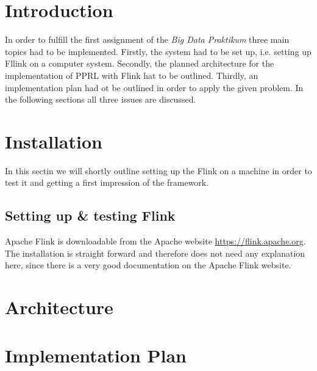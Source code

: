 \documentclass[10pt]{article}
\begin{document}
    

    \section{Introduction}

        In order to fulfill the first assignment of the \textit{Big Data Praktikum} three main topics had to be
        implemented. Firstly, the system had to be set up, i.e. setting up Fllink on a computer system. Secondly,
        the planned architecture for the implementation of PPRL with Flink hat to be outlined. Thirdly, an
        implementation plan had ot be outlined in order to apply the given problem.
        In the following sections all three issues are discussed.

    \section{Installation}

        In this sectin we will shortly outline setting up the Flink on a machine in order to test it and
        getting a first impression of the framework.

        \subsection{Setting up \& testing Flink}

        Apache Flink is downloadable from the Apache website \url{https://flink.apache.org}. The installation
        is straight forward and therefore does not need any explanation here, since there is a very good
        documentation on the Apache Flink website.



    \section{Architecture}

    \section{Implementation Plan}





\end{document}
